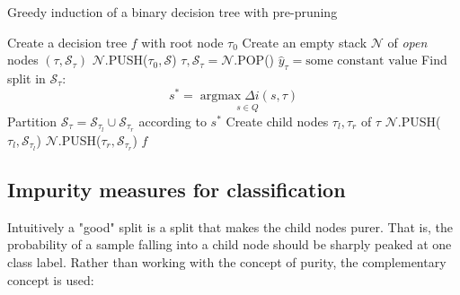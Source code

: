 \documentclass[12pt,a4paper]{article}
\begin{document}
\begin{algorithm} 
	\caption{Greedy induction of a binary decision tree with pre-pruning}\label{algo:decision-tree}
	\begin{algorithmic}[1]
		\State Create a decision tree $f$ with root node $\tau_0$ 
		\State Create an empty stack $\mathcal N$ of \textit{open} nodes $(\tau, \mathcal S_\tau)$ 
		\State $\mathcal N$.PUSH($\tau_0, \mathcal S$)
		\State $\tau, \mathcal S_\tau = \mathcal N$.POP()
		\State $\hat y_\tau = \text{some constant value}$ 
		\Else{}
		 \State Find split in $\mathcal S_\tau$: $$s^*= \underset{s\in Q}{\operatorname{argmax} \Delta i (s,\tau) }$$
		 \State Partition $\mathcal S_\tau = \mathcal S_{\tau_l} \cup \mathcal S_{\tau_r}$ according to $s^*$
		 \State Create child nodes $\tau_l, \tau_r$ of $\tau$
		 \State $\mathcal N$.PUSH($\tau_l, \mathcal S_{\tau_l}$)
		 \State $\mathcal N$.PUSH($\tau_r, \mathcal S_{\tau_r}$)
		\EndIf
		\EndWhile
		\Return $f$
		\EndProcedure
	\end{algorithmic}
\end{algorithm}

\subsection{Impurity measures for classification}
Intuitively a "good" split is a split that makes the child nodes purer. That is, the probability of a sample falling into a child node should be sharply peaked at one class label. Rather than working with the concept of purity, the complementary concept is used\cite{cart84}:
\end{document}
